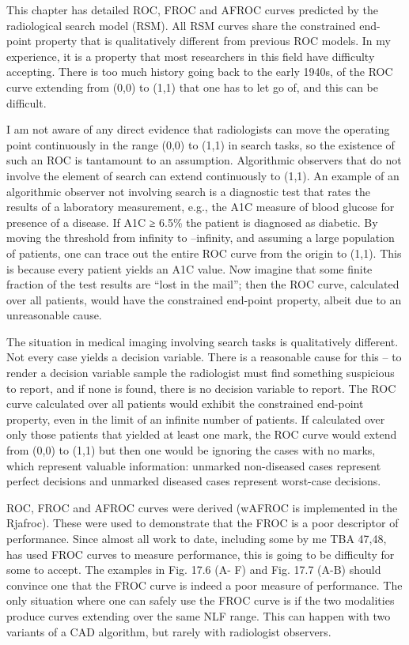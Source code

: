 \documentclass[
]{book}
\begin{document}
This chapter has detailed ROC, FROC and AFROC curves predicted by the radiological search model (RSM). All RSM curves share the constrained end-point property that is qualitatively different from previous ROC models. In my experience, it is a property that most researchers in this field have difficulty accepting. There is too much history going back to the early 1940s, of the ROC curve extending from (0,0) to (1,1) that one has to let go of, and this can be difficult.

I am not aware of any direct evidence that radiologists can move the operating point continuously in the range (0,0) to (1,1) in search tasks, so the existence of such an ROC is tantamount to an assumption. Algorithmic observers that do not involve the element of search can extend continuously to (1,1). An example of an algorithmic observer not involving search is a diagnostic test that rates the results of a laboratory measurement, e.g., the A1C measure of blood glucose for presence of a disease. If A1C ≥ 6.5\% the patient is diagnosed as diabetic. By moving the threshold from infinity to --infinity, and assuming a large population of patients, one can trace out the entire ROC curve from the origin to (1,1). This is because every patient yields an A1C value. Now imagine that some finite fraction of the test results are ``lost in the mail''; then the ROC curve, calculated over all patients, would have the constrained end-point property, albeit due to an unreasonable cause.

The situation in medical imaging involving search tasks is qualitatively different. Not every case yields a decision variable. There is a reasonable cause for this -- to render a decision variable sample the radiologist must find something suspicious to report, and if none is found, there is no decision variable to report. The ROC curve calculated over all patients would exhibit the constrained end-point property, even in the limit of an infinite number of patients. If calculated over only those patients that yielded at least one mark, the ROC curve would extend from (0,0) to (1,1) but then one would be ignoring the cases with no marks, which represent valuable information: unmarked non-diseased cases represent perfect decisions and unmarked diseased cases represent worst-case decisions.

ROC, FROC and AFROC curves were derived (wAFROC is implemented in the Rjafroc). These were used to demonstrate that the FROC is a poor descriptor of performance. Since almost all work to date, including some by me TBA 47,48, has used FROC curves to measure performance, this is going to be difficulty for some to accept. The examples in Fig. 17.6 (A- F) and Fig. 17.7 (A-B) should convince one that the FROC curve is indeed a poor measure of performance. The only situation where one can safely use the FROC curve is if the two modalities produce curves extending over the same NLF range. This can happen with two variants of a CAD algorithm, but rarely with radiologist observers.
\end{document}
